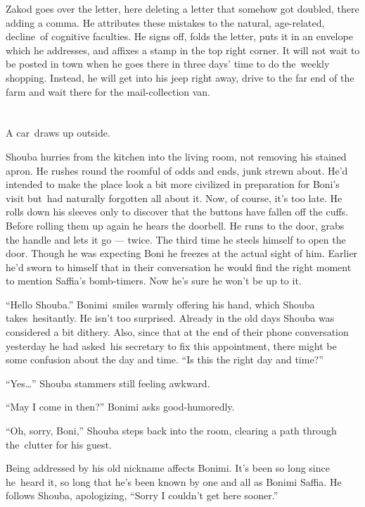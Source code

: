 \documentclass[twoside,11pt,openany]{book}
\begin{document}
Zakod goes over the letter, here deleting a letter that somehow got doubled, there adding a comma. He attributes these
mistakes to the natural, age-related, decline~of cognitive faculties.  He signs off, folds the letter, puts it in an
envelope which he addresses, and affixes a stamp in the top right corner. It will not wait to be posted in town when he
goes there in three days{'} time to do the~weekly shopping. Instead, he will get into his jeep right away, drive to the
far end of the farm and wait there for the mail-collection van.


\chapter{}

A car~draws up outside.{ }

Shouba hurries from the kitchen into the living room, not removing his stained apron. He rushes round the roomful of
odds and ends, junk strewn about. He'd intended to make the place look a bit more civilized in preparation for Boni's
visit but~had naturally forgotten all about it. Now, of course, it's too late. He rolls down his sleeves only to
discover that the buttons have fallen off the cuffs. Before rolling them up again he hears the doorbell. He runs to the
door, grabs the handle and lets it go --- twice. The third time he steels himself to open the door. Though he was
expecting Boni he freezes at the actual sight of him. Earlier he'd sworn to himself that in their conversation he
would find the right moment to mention Saffia's bomb-timers. Now he's sure he won't be up to it.

``Hello Shouba.'' Bonimi~smiles warmly offering his hand, which Shouba takes~hesitantly. He
isn't too surprised. Already in the old days Shouba was considered a bit dithery.  Also, since that at the end of
their phone conversation yesterday he had asked~his secretary to fix this appointment, there might be some confusion
about the day and time. ``Is this the right day and time?''

``Yes{\ldots}'' Shouba stammers still feeling awkward.

``May I come in then?'' Bonimi asks good-humoredly.

``Oh, sorry, Boni,'' Shouba steps back into the room, clearing a path through the~clutter for
his guest.

Being addressed by his old nickname affects Bonimi. It's been so long since he~heard it, so long that he's been known
by{ }one and all as Bonimi Saffia. He follows Shouba, apologizing, ``Sorry I
couldn't get here sooner.''
\end{document}
